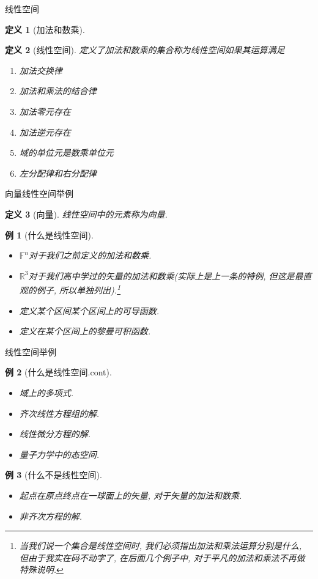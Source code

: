 \documentclass[11pt]{beamer}
\newtheorem{defi}{定义}[section]
\newtheorem{exmp}{例}[section]
\begin{document}
\begin{frame}{线性空间}
	\begin{defi}[加法和数乘]
	\end{defi}
	\begin{defi}[线性空间]
		定义了加法和数乘的集合称为线性空间如果其运算满足
		\begin{enumerate}
			\item 加法交换律
			\item 加法和乘法的结合律
			\item 加法零元存在
			\item 加法逆元存在
			\item 域的单位元是数乘单位元
			\item 左分配律和右分配律
		\end{enumerate}
	\end{defi}
\end{frame}

\begin{frame}{向量\quad 线性空间举例}
	\begin{defi}[向量]
		线性空间中的元素称为向量.
	\end{defi}
	\begin{exmp}[什么是线性空间]
		\begin{itemize}
			\item $\mathbb{F}^n$对于我们之前定义的加法和数乘.
			\item $\mathbb{R}^3$对于我们高中学过的矢量的加法和数乘(实际上是上一条的特例, 但这是最直观的例子, 所以单独列出).\footnote{当我们说一个集合是线性空间时, 我们必须指出加法和乘法运算分别是什么, 但由于我实在码不动字了, 在后面几个例子中, 对于平凡的加法和乘法不再做特殊说明.}
			\item 定义某个区间某个区间上的可导函数.
			\item 定义在某个区间上的黎曼可积函数.
		\end{itemize}
	\end{exmp}
\end{frame}

\begin{frame}{线性空间举例}
	\begin{exmp}[什么是线性空间.cont]
		\begin{itemize}
			\item 域上的多项式.
			\item 齐次线性方程组的解.
			\item 线性微分方程的解.
			\item 量子力学中的态空间.
		\end{itemize}
	\end{exmp}
	\begin{exmp}[什么不是线性空间]
		\begin{itemize}
			\item 起点在原点终点在一球面上的矢量, 对于矢量的加法和数乘.
			\item 非齐次方程的解.
		\end{itemize}
	\end{exmp}
\end{frame}
\end{document}
